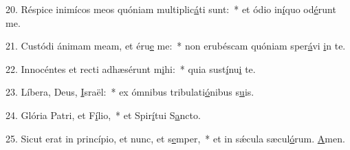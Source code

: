 20. Réspice inimícos meos quóniam multiplic\uline{á}ti sunt:~* et ódio in\uline{í}quo od\uline{é}runt me.\par 
21. Custódi ánimam meam, et éru\uline{e} me:~* non erubéscam quóniam sper\uline{á}vi \uline{i}n te.\par 
22. Innocéntes et recti adhæsérunt m\uline{i}hi:~* quia sust\uline{í}nu\uline{i} te.\par 
23. Líbera, Deus, \uline{I}sraël:~* ex ómnibus tribulati\uline{ó}nibus s\uline{u}is.\par 
24. Glória Patri, et F\uline{í}lio,~* et Spir\uline{í}tui S\uline{a}ncto.\par 
25. Sicut erat in princípio, et nunc, et s\uline{e}mper,~* et in sǽcula sæcul\uline{ó}rum. \uline{A}men.\par 
